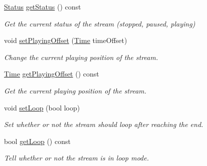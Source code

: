 \begin{DoxyCompactItemize}
\hyperlink{classsf_1_1SoundSource_ac43af72c98c077500b239bc75b812f03}{Status} \hyperlink{classsf_1_1SoundStream_a75f722e7edcfa9952ff0c643966c6858}{get\-Status} () const 
\begin{DoxyCompactList}\small\item\em Get the current status of the stream (stopped, paused, playing) \end{DoxyCompactList}\item 
void \hyperlink{classsf_1_1SoundStream_af416a5f84c8750d2acb9821d78bc8646}{set\-Playing\-Offset} (\hyperlink{classsf_1_1Time}{Time} time\-Offset)
\begin{DoxyCompactList}\small\item\em Change the current playing position of the stream. \end{DoxyCompactList}\item 
\hyperlink{classsf_1_1Time}{Time} \hyperlink{classsf_1_1SoundStream_a6070416e1e1a11b5915e9314dd6638f7}{get\-Playing\-Offset} () const 
\begin{DoxyCompactList}\small\item\em Get the current playing position of the stream. \end{DoxyCompactList}\item 
void \hyperlink{classsf_1_1SoundStream_a43fade018ffba7e4f847a9f00b353f3d}{set\-Loop} (bool loop)
\begin{DoxyCompactList}\small\item\em Set whether or not the stream should loop after reaching the end. \end{DoxyCompactList}\item 
bool \hyperlink{classsf_1_1SoundStream_ad8bbf6c0d2ff2d75e19035dea3fd77c3}{get\-Loop} () const 
\begin{DoxyCompactList}\small\item\em Tell whether or not the stream is in loop mode. \end{DoxyCompactList}\end{DoxyCompactItemize}
